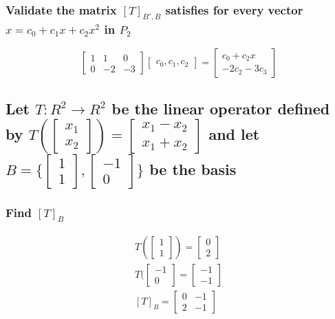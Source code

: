 \documentclass[12pt, a4paper]{article}
\begin{document}
			\subsubsection{Validate the matrix $[T]_{B',B}$ satisfies for every vector $x=c_0+c_1x+c_2x^2$ in $P_2$}
				$$\begin{bmatrix}1&1&0\\0&-2&-3\end{bmatrix}\begin{bmatrix}c_0,c_1,c_2\end{bmatrix}=\begin{bmatrix}c_0+c_2x\\-2c_2-3c_3\end{bmatrix}$$
		\subsection{Let $T:R^2\rightarrow R^2$ be the linear operator defined by $T(\begin{bmatrix}x_1\\x_2\end{bmatrix})=\begin{bmatrix}x_1-x_2\\x_1+x_2\end{bmatrix}$ and let $B=\{\begin{bmatrix}1\\1\end{bmatrix},\begin{bmatrix}-1\\0\end{bmatrix}\}$ be the basis}
			\subsubsection{Find $[T]_B$}
				\begin{align*}
					T(\begin{bmatrix}1\\1\end{bmatrix})=\begin{bmatrix}0\\2\end{bmatrix}\\
					T(\begin{bmatrix}-1\\0\end{bmatrix}=\begin{bmatrix}-1\\-1\end{bmatrix}\\
					[T]_B=\begin{bmatrix}0&-1\\2&-1\end{bmatrix}
				\end{align*}
\end{document}
